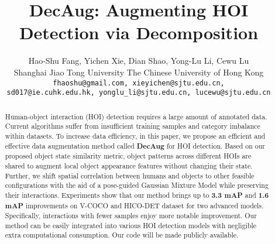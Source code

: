 \documentclass[10pt,twocolumn,letterpaper]{article}
\begin{document}
\title{\textbf{DecAug: Augmenting HOI Detection via Decomposition}}

\author{Hao-Shu Fang, Yichen Xie, Dian Shao, Yong-Lu Li, Cewu Lu\\
Shanghai Jiao Tong University \quad
The Chinese University of Hong Kong\\
{\tt\small fhaoshu@gmail.com, xieyichen@sjtu.edu.cn,} \\
{\tt\small sd017@ie.cuhk.edu.hk, yonglu\_li@sjtu.edu.cn, lucewu@sjtu.edu.cn}
}

\date{}
\maketitle
\let\thefootnote\relax{}
\let\thefootnote\relax{}

\begin{abstract}
Human-object interaction (HOI) detection requires a large amount of annotated data. Current algorithms suffer from insufficient training samples and category imbalance within datasets. To increase data efficiency, in this paper, we propose an efficient and effective data augmentation method called \textbf{DecAug} for HOI detection. Based on our proposed object state similarity metric, object patterns across different HOIs are shared to augment local object appearance features without changing their state. Further, we shift spatial correlation between humans and objects to other feasible configurations with the aid of a pose-guided Gaussian Mixture Model while preserving their interactions. Experiments show that our method brings up to \textbf{3.3 mAP} and \textbf{1.6 mAP} improvements on V-COCO and HICO-DET dataset for two advanced models. Specifically, interactions with fewer samples enjoy more notable improvement. Our method can be easily integrated into various HOI detection models with negligible extra computational consumption. Our code will be made publicly available.
\end{abstract}
\end{document}
